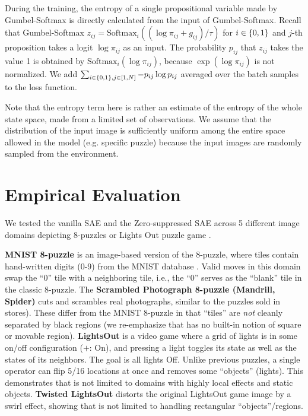 During the training, the entropy of a single propositional variable made by Gumbel-Softmax
 is directly calculated from the input of Gumbel-Softmax.
Recall that Gumbel-Softmax $z_{ij} = \text{Softmax}_i((\log \pi_{ij} + g_{ij})/\tau)$ for $i\in{\left\{0,1\right\}}$
and $j$-th proposition takes a logit $\log \pi_{ij}$ as an input.
The probability $p_{ij}$ that $z_{ij}$ takes the value 1 is obtained by $\text{Softmax}_i(\log \pi_{ij})$,
because $\exp (\log \pi_{ij})$ is not normalized.
We add $\sum_{i\in{\left\{0,1\right\}}, j\in [1,N]} -p_{ij}\log p_{ij} $ averaged over the batch samples to the loss function.

Note that the entropy term here is rather an estimate of the entropy of
the whole state space, made from a limited set of observations.
We assume that the distribution of the input image is sufficiently
uniform among the entire space allowed in the model (e.g. specific
puzzle) because the input images are randomly sampled from
the environment.



\section{Empirical Evaluation}
\label{evaluation}

We tested the vanilla SAE and the Zero-suppressed SAE across 5 different
image domains depicting 8-puzzles or Lights Out puzzle game \cite{lightsout}.

\textbf{MNIST 8-puzzle}
is an image-based version of the 8-puzzle, where tiles contain hand-written digits (0-9) from the  MNIST database \cite{lecun1998gradient}.
Valid moves in this domain swap the ``0'' tile  with a neighboring tile, i.e., the ``0'' serves as the ``blank'' tile in the classic 8-puzzle. 
The \textbf{Scrambled Photograph 8-puzzle (Mandrill, Spider)} cuts and scrambles real photographs, similar to the puzzles sold in stores).
These differ from the MNIST 8-puzzle in that ``tiles'' are \textit{not} cleanly separated by black regions
(we re-emphasize that \latentplanner has no built-in notion of square or movable region).
\textbf{LightsOut} is
a video game where a grid of lights is in some on/off configuration ($+$: On),
and pressing a light toggles its state as well as the states of its neighbors.
The goal is all lights Off.
Unlike previous puzzles, a single operator can flip 5/16 locations at once and
removes some ``objects'' (lights).
This demonstrates that \latentplanner is not limited to domains with highly local effects and static objects.
\textbf{Twisted LightsOut} distorts the original LightsOut game image by a swirl effect, 
showing that \latentplanner is not limited to handling rectangular ``objects''/regions.

